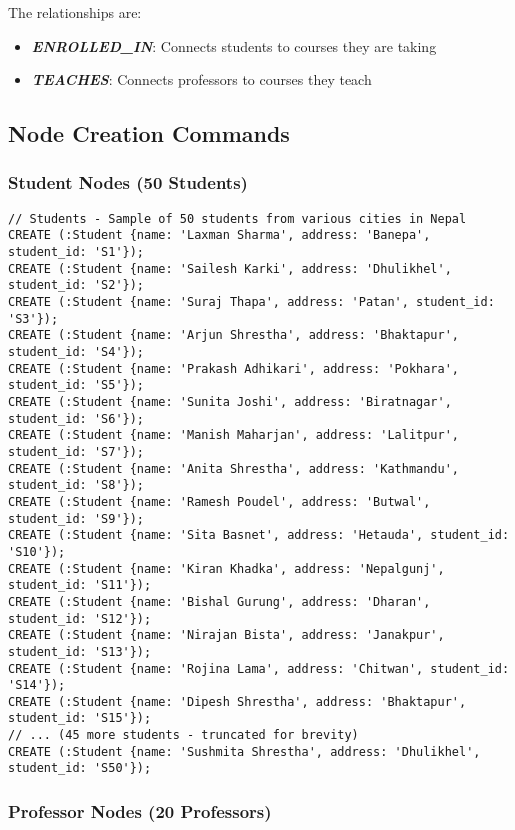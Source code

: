 The relationships are:
\begin{itemize}
    \item \textit{\textbf{ENROLLED\_IN}}: Connects students to courses they are taking
    \item \textit{\textbf{TEACHES}}: Connects professors to courses they teach
\end{itemize}

\subsection{Node Creation Commands}

\subsubsection{Student Nodes (50 Students)}

\begin{verbatim}
// Students - Sample of 50 students from various cities in Nepal
CREATE (:Student {name: 'Laxman Sharma', address: 'Banepa', student_id: 'S1'});
CREATE (:Student {name: 'Sailesh Karki', address: 'Dhulikhel', student_id: 'S2'});
CREATE (:Student {name: 'Suraj Thapa', address: 'Patan', student_id: 'S3'});
CREATE (:Student {name: 'Arjun Shrestha', address: 'Bhaktapur', student_id: 'S4'});
CREATE (:Student {name: 'Prakash Adhikari', address: 'Pokhara', student_id: 'S5'});
CREATE (:Student {name: 'Sunita Joshi', address: 'Biratnagar', student_id: 'S6'});
CREATE (:Student {name: 'Manish Maharjan', address: 'Lalitpur', student_id: 'S7'});
CREATE (:Student {name: 'Anita Shrestha', address: 'Kathmandu', student_id: 'S8'});
CREATE (:Student {name: 'Ramesh Poudel', address: 'Butwal', student_id: 'S9'});
CREATE (:Student {name: 'Sita Basnet', address: 'Hetauda', student_id: 'S10'});
CREATE (:Student {name: 'Kiran Khadka', address: 'Nepalgunj', student_id: 'S11'});
CREATE (:Student {name: 'Bishal Gurung', address: 'Dharan', student_id: 'S12'});
CREATE (:Student {name: 'Nirajan Bista', address: 'Janakpur', student_id: 'S13'});
CREATE (:Student {name: 'Rojina Lama', address: 'Chitwan', student_id: 'S14'});
CREATE (:Student {name: 'Dipesh Shrestha', address: 'Bhaktapur', student_id: 'S15'});
// ... (45 more students - truncated for brevity)
CREATE (:Student {name: 'Sushmita Shrestha', address: 'Dhulikhel', student_id: 'S50'});
\end{verbatim}

\subsubsection{Professor Nodes (20 Professors)}

